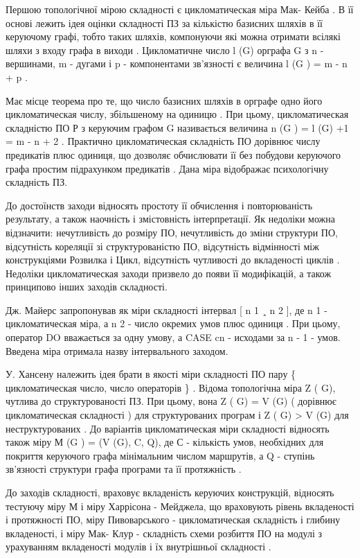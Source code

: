 Першою топологічної мірою складності є цикломатическая міра Мак- Кейба . В її основі лежить ідея оцінки складності ПЗ за кількістю базисних шляхів в її керуючому графі, тобто таких шляхів, компонуючи які можна отримати всілякі шляхи з входу графа в виходи . Цикломатичне число l (G) орграфа G з n - вершинами, m - дугами і p - компонентами зв'язності є величина l (G ) = m - n + p .

Має місце теорема про те, що число базисних шляхів в орграфе одно його цикломатическая числу, збільшеному на одиницю . При цьому, цикломатическая складністю ПО Р з керуючим графом G називається величина n (G ) = l (G) +1 = m - n + 2 . Практично цикломатическая складність ПО дорівнює числу предикатів плюс одиниця, що дозволяє обчислювати її без побудови керуючого графа простим підрахунком предикатів . Дана міра відображає психологічну складність ПЗ.

До достоїнств заходи відносять простоту її обчислення і повторюваність результату, а також наочність і змістовність інтерпретації. Як недоліки можна відзначити: нечутливість до розміру ПО, нечутливість до зміни структури ПО, відсутність кореляції зі структурованістю ПО, відсутність відмінності між конструкціями Розвилка і Цикл, відсутність чутливості до вкладеності циклів . Недоліки цикломатическая заходи призвело до появи її модифікацій, а також принципово інших заходів складності.

Дж. Майерс запропонував як міри складності інтервал {[} n 1 ¸ n 2 {]}, де n 1 - цикломатическая міра, а n 2 - число окремих умов плюс одиниця . При цьому, оператор DO вважається за одну умову, а CASE cn - исходами за n - 1 - умов. Введена міра отримала назву інтервального заходом.

У. Хансену належить ідея брати в якості міри складності ПО пару \{ цикломатическая число, число операторів \} . Відома топологічна міра Z ( G), чутлива до структурованості ПЗ. При цьому, вона Z ( G) = V (G) ( дорівнює цикломатическая складності ) для структурованих програм і Z ( G) \textgreater{} V (G) для неструктурованих . До варіантів цикломатическая міри складності відносять також міру М (G ) = (V (G), C, Q), де С - кількість умов, необхідних для покриття керуючого графа мінімальним числом маршрутів, а Q - ступінь зв'язності структури графа програми та її протяжність .

До заходів складності, враховує вкладеність керуючих конструкцій, відносять тестуючу міру М і міру Харрісона - Мейджела, що враховують рівень вкладеності і протяжності ПО, міру Пивоварського - цикломатическая складність і глибину вкладеності, і міру Мак- Клур - складність схеми розбиття ПО на модулі з урахуванням вкладеності модулів і їх внутрішньої складності .

